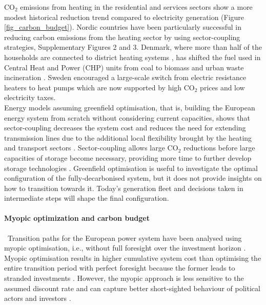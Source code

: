 \documentclass[5p]{elsarticle} %
\begin{document}
CO$_2$ emissions from heating in the residential and services sectors show a more modest historical reduction trend compared to electricity generation (Figure \ref{fig_carbon_budget}). Nordic countries have been particularly successful in reducing carbon emissions from the heating sector by using sector-coupling strategies, Supplementary Figures 2 and 3. Denmark, where more than half of the households are connected to district heating systems \cite{Gross_2019}, has shifted the fuel used in Central Heat and Power (CHP) units from coal to biomass and urban waste incineration \cite{DEA_2015}. Sweden encouraged a large-scale switch from electric resistance heaters to heat pumps \cite{Gross_2019} which are now supported by high CO$_2$ prices \cite{Carbon_pricing_2019} and low electricity taxes.\\ 

Energy models assuming greenfield optimisation, that is, building the European energy system from scratch without considering current capacities, shows that sector-coupling decreases the system cost and reduces the need for extending transmission lines due to the additional local flexibility brought by the heating and transport sectors \cite{Brown_2018}. Sector-coupling allows large CO$_2$ reductions before large capacities of storage become necessary, providing more time to further develop storage technologies \cite{Victoria_2019_storage}. Greenfield optimisation is useful to investigate the optimal configuration of the fully-decarbonised system, but it does not provide insights on how to transition towards it. Today's generation fleet and decisions taken in intermediate steps will shape the final configuration. 

\paragraph{\textbf{Myopic optimization and carbon budget}} \
Transition paths for the European power system have been analysed using myopic optimisation, i.e., without full foresight over the investment horizon \cite{Bogdanov_2019, Plesmann_2017, Gerbaulet_2019, Poncelet_2016}. Myopic optimisation results in higher cumulative system cost than optimising the entire transition period with perfect foresight because the former leads to stranded investments \cite{Gerbaulet_2019, Heuberger_2018}. However, the myopic approach is less sensitive to the assumed discount rate and can capture better short-sighted behaviour of political actors and investors \cite{Poncelet_2016, Gerbaulet_2019}. \\
\end{document}
